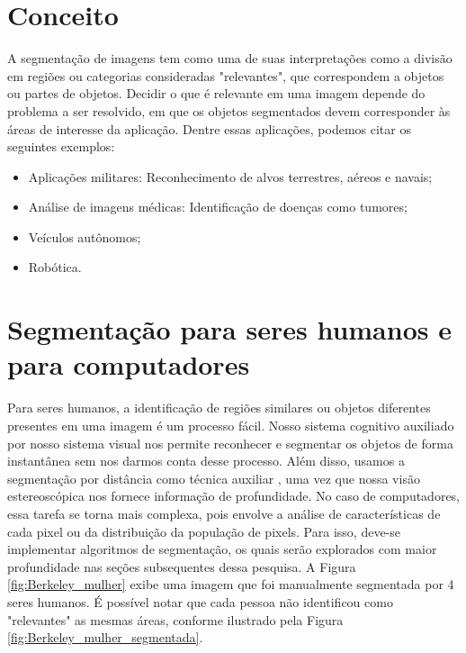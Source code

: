 \section{Conceito}
A segmentação de imagens tem como uma de suas interpretações como a divisão em regiões ou categorias consideradas "relevantes", que correspondem a objetos ou partes de objetos. Decidir o que é relevante em uma imagem depende do problema a ser resolvido, em que os objetos segmentados devem corresponder às áreas de interesse da aplicação. Dentre essas aplicações, podemos citar os seguintes exemplos:

\begin{itemize}
\item Aplicações militares: Reconhecimento de alvos terrestres, aéreos e navais;
\item Análise de imagens médicas: Identificação de doenças como tumores;
\item Veículos autônomos;
\item Robótica.
\end{itemize}

\section{Segmentação para seres humanos e para computadores}
Para seres humanos, a identificação de regiões similares ou objetos diferentes presentes em uma imagem é um processo fácil. Nosso sistema cognitivo auxiliado por nosso sistema visual nos permite reconhecer e segmentar os objetos de forma instantânea sem nos darmos conta desse processo. Além disso, usamos a segmentação por distância como técnica auxiliar , uma vez que nossa visão estereoscópica nos fornece informação de profundidade.
No caso de computadores, essa tarefa se torna mais complexa, pois envolve a análise de características de cada pixel ou da distribuição da população de pixels. Para isso, deve-se implementar algoritmos de segmentação, os quais serão explorados com maior profundidade nas seções subsequentes dessa pesquisa. A Figura \ref{fig:Berkeley_mulher} exibe uma imagem que foi manualmente segmentada por 4 seres humanos. É possível notar que cada pessoa não identificou como "relevantes" as mesmas áreas, conforme ilustrado pela Figura \ref{fig:Berkeley_mulher_segmentada}. 

